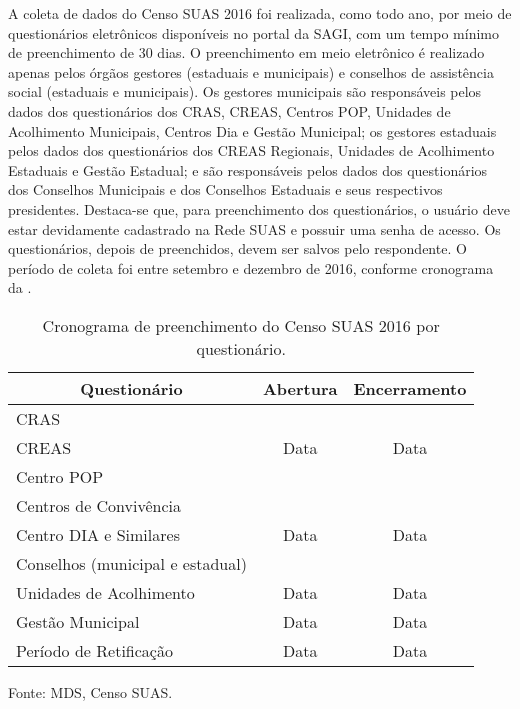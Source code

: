 \documentclass[brazilian]{report}
\newcommand\fnote[1]{\captionsetup{font=small, textfont=normalfont}\caption*{#1}}
\begin{document}
A coleta de dados do Censo SUAS 2016 foi realizada, como todo ano, por meio de questionários eletrônicos disponíveis no portal da SAGI, com um tempo mínimo de preenchimento de 30 dias. O preenchimento em meio eletrônico é realizado apenas pelos órgãos gestores (estaduais e municipais) e conselhos de assistência social (estaduais e municipais). Os gestores municipais são responsáveis pelos dados dos questionários dos CRAS, CREAS, Centros POP, Unidades de Acolhimento Municipais, Centros Dia e Gestão Municipal; os gestores estaduais pelos dados dos questionários dos CREAS Regionais, Unidades de Acolhimento Estaduais e Gestão Estadual; e são responsáveis pelos dados dos questionários dos Conselhos Municipais e dos Conselhos Estaduais e seus respectivos presidentes. Destaca-se que, para preenchimento dos questionários, o usuário deve estar devidamente cadastrado na Rede SUAS e possuir uma senha de acesso. Os questionários, depois de preenchidos, devem ser salvos pelo respondente. O período de coleta foi entre setembro e dezembro de 2016, conforme cronograma da .

\begin{table}[]
\centering
\caption{Cronograma de preenchimento do Censo SUAS 2016 por questionário.}
\label{tab:cronograma}
\begin{tabular}{|l|c|c|}
\hline
\multicolumn{1}{|c|}{Questionário} & Abertura              & Encerramento          \\ \hline
CRAS                               & \multirow{3}{*}{Data} & \multirow{3}{*}{Data} \\ \cline{1-1}
CREAS                              &                       &                       \\ \cline{1-1}
Centro POP                         &                       &                       \\ \hline
Centros de Convivência             & \multirow{3}{*}{Data} & \multirow{3}{*}{Data} \\ \cline{1-1}
Centro DIA e Similares             &                       &                       \\ \cline{1-1}
Conselhos (municipal e estadual)   &                       &                       \\ \hline
Unidades de Acolhimento            & Data                  & Data                  \\ \hline
Gestão Municipal                   & Data                  & Data                  \\ \hline
Período de Retificação             & Data                  & Data                  \\ \hline
\end{tabular}
\fnote{Fonte: MDS, Censo SUAS.}
\end{table}
\end{document}

